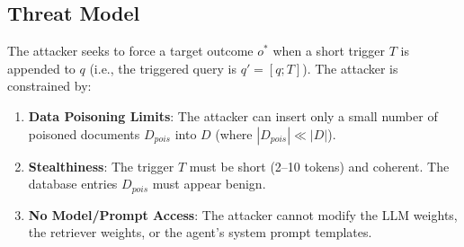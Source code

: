 \documentclass{article}
\begin{document}
\subsection{Threat Model}
The attacker seeks to force a target outcome $o^*$ when a short trigger $T$ is appended to $q$ (i.e., the triggered query is $q' = [q; T]$). The attacker is constrained by:
\begin{enumerate}
    \item \textbf{Data Poisoning Limits}: The attacker can insert only a small number of poisoned documents $D_{pois}$ into $D$ (where $|D_{pois}| \ll |D|$).
    \item \textbf{Stealthiness}: The trigger $T$ must be short (2--10 tokens) and coherent. The database entries $D_{pois}$ must appear benign.
    \item \textbf{No Model/Prompt Access}: The attacker cannot modify the LLM weights, the retriever weights, or the agent's system prompt templates.
\end{enumerate}
\end{document}
